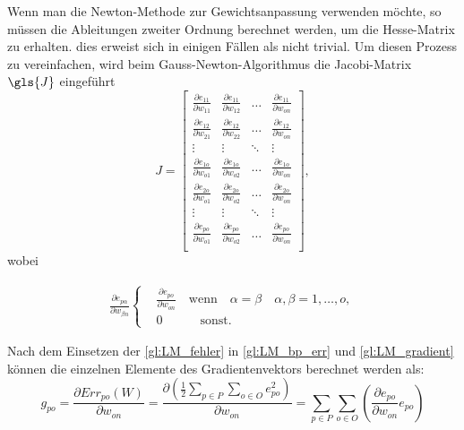 Wenn man die Newton-Methode zur Gewichtsanpassung verwenden möchte, so müssen die Ableitungen zweiter Ordnung berechnet werden, um die Hesse-Matrix zu erhalten. dies erweist sich in einigen Fällen als nicht trivial. Um diesen Prozess zu vereinfachen, wird beim Gauss-Newton-Algorithmus die Jacobi-Matrix $\gls{J}$ eingeführt
\begin{equation}
J
=
 \begin{bmatrix}
    \frac{\partial e_{11}}{\partial w_{11}} & \frac{\partial e_{11}}{\partial w_{12}}  & \dots  & \frac{\partial e_{11}}{\partial w_{on}} \\
    \frac{\partial e_{12}}{\partial w_{21}} & \frac{\partial e_{12}}{\partial w_{22}}  & \dots  & \frac{\partial e_{12}}{\partial w_{on}} \\
    \vdots & \vdots & \ddots & \vdots \\
    \frac{\partial e_{1o}}{\partial w_{o1}} & \frac{\partial e_{1o}}{\partial w_{o2}}  & \dots  & \frac{\partial e_{1o}}{\partial w_{on}} \\
    \frac{\partial e_{2o}}{\partial w_{o1}} & \frac{\partial e_{2o}}{\partial w_{o2}}  & \dots  & \frac{\partial e_{2o}}{\partial w_{on}} \\
    \vdots & \vdots & \ddots & \vdots \\
    \frac{\partial e_{po}}{\partial w_{o1}} & \frac{\partial e_{po}}{\partial w_{o2}}  & \dots  & \frac{\partial e_{po}}{\partial w_{on}} \\
 \end{bmatrix}
,
\end{equation}
wobei

\begin{align}
 \frac{\partial e_{p \alpha}}{\partial w_{\beta n}}
\left \{
\begin{aligned}
& \frac{\partial e_{p o}}{\partial w_{o n}} \quad \text{wenn} \quad \alpha=\beta \quad \alpha,\beta=1,\dots,o, \\
& 0 \quad \qquad \text{sonst}.
\end{aligned}
\right.
\label{gl:LM_fuellen}
\end{align}


Nach dem Einsetzen der \autoref{gl:LM_fehler} in \autoref{gl:LM_bp_err} und \autoref{gl:LM_gradient} können die einzelnen Elemente des Gradientenvektors berechnet werden als:
\begin{equation}
g_{po} = \frac{\partial Err_{po}(W)}{\partial w_{on}} = \frac{\partial \left (\frac{1}{2} \sum_{p \in P} \sum_{o \in O} e_{po}^2 \right )}{\partial w_{on}} 
=
\sum_{p \in P} \sum_{o \in O} \left ( \frac{\partial e_{po}}{\partial w_{on}} e_{po} \right )
\label{gl:LM_g-J}
\end{equation}


